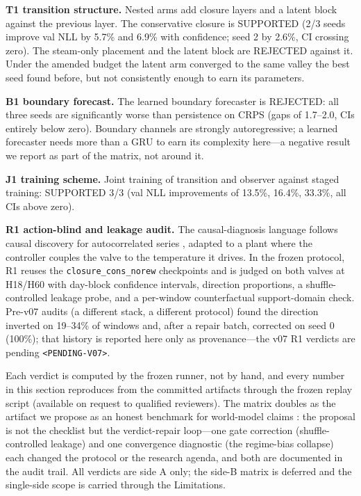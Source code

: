 \documentclass{article}
\begin{document}
\textbf{T1 transition structure.} Nested arms add closure layers and a latent block
against the previous layer. The conservative closure is SUPPORTED (2/3 seeds improve
val NLL by 5.7\% and 6.9\% with confidence; seed 2 by 2.6\%, CI crossing zero). The
steam-only placement and the latent block are REJECTED against it. Under the amended
budget the latent arm converged to the same valley the best seed found before, but
not consistently enough to earn its parameters.

\textbf{B1 boundary forecast.} The learned boundary forecaster is REJECTED: all three
seeds are significantly worse than persistence on CRPS (gaps of 1.7--2.0, CIs
entirely below zero). Boundary channels are strongly autoregressive; a learned
forecaster needs more than a GRU to earn its complexity here---a negative result we
report as part of the matrix, not around it.

\textbf{J1 training scheme.} Joint training of transition and observer against staged
training: SUPPORTED 3/3 (val NLL improvements of 13.5\%, 16.4\%, 33.3\%, all CIs
above zero).

\textbf{R1 action-blind and leakage audit.} The causal-diagnosis language follows
causal discovery for autocorrelated series \cite{runge2020pcmci}, adapted to a plant
where the controller couples the valve to the temperature it drives. In the frozen
protocol, R1 reuses the \texttt{closure\_cons\_norew} checkpoints and is judged on
both valves at H18/H60 with day-block confidence intervals, direction proportions, a
shuffle-controlled leakage probe, and a per-window counterfactual support-domain
check. Pre-v07 audits (a different stack, a different protocol) found the direction
inverted on 19--34\% of windows and, after a repair batch, corrected on seed 0
(100\%); that history is reported here only as provenance---the v07 R1 verdicts are
pending \texttt{<PENDING-V07>}.

Each verdict is computed by the frozen runner, not by hand, and every number in this
section reproduces from the committed artifacts through the frozen replay script
(available on request to qualified reviewers). The matrix doubles as the artifact we
propose as an honest benchmark for world-model claims \cite{ghosh2026rom}: the
proposal is not the checklist but the verdict-repair loop---one gate correction
(shuffle-controlled leakage) and one convergence diagnostic (the regime-bias
collapse) each changed the protocol or the research agenda, and both are documented
in the audit trail. All verdicts are side A only; the side-B matrix is deferred and
the single-side scope is carried through the Limitations.
\end{document}
